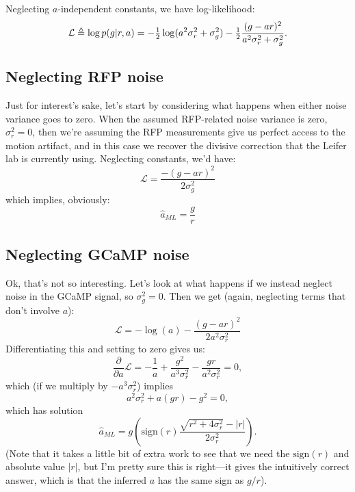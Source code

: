 \documentclass[11pt]{article}
\newcommand{\LL}{\mathcal{L}}
\newcommand{\vr}{\sigma^2_r}
\newcommand{\vg}{\sigma^2_g}
\begin{document}
Neglecting $a$-independent constants, we have log-likelihood:
\begin{equation}
\LL \triangleq \log p(g|r,a)  = - \tonehlf \log (a^2 \vr + \vg) - \tonehlf
\frac{(g-ar)^2}{a^2\vr + \vg}.  \label{eq:logli}
\end{equation}


\subsection{Neglecting RFP noise}
Just for interest's sake, let's start by considering what happens when
either noise variance goes to zero.  When the assumed RFP-related
noise variance is zero, $\vr=0$, then we're assuming the RFP
measurements give us perfect access to the motion artifact, and in
this case we recover the divisive correction that the Leifer lab is
currently using.  Neglecting constants, we'd have:
\begin{equation}
\LL = \frac{-(g-ar)^2}{2\vg}
\end{equation}
which implies, obviously:
\begin{equation}
\hat a_{ML} = \frac{g}{r}
\end{equation}

\subsection{Neglecting GCaMP noise}
Ok, that's not so interesting.  Let's look at what happens if we
instead neglect noise in the GCaMP signal, so $\vg = 0$. Then we get
(again, neglecting terms that don't involve $a$):
\begin{equation}
\LL =  -\log (a)   -  \frac{(g-ar)^2}{2a^2\vr}
\end{equation}
Differentiating this and setting to zero gives us:
\begin{equation}
\frac{\partial}{\partial a} \LL  =  -\frac{1}{a}  + \frac{g^2}{a^3
  \vr} - \frac{gr}{a^2\vr}  = 0,
\end{equation}
which (if we multiply by $-a^3 \vr$) implies
\begin{equation}
a^2 \vr + a (gr) - g^2 = 0,
\end{equation}
which has solution
\begin{equation}
\hat a_{ML} =  g \left( \mathrm{sign}(r) \frac{\sqrt{r^2 + 4\vr} - |r|}{2\vr}\right).
\end{equation}
(Note that it takes a little bit of extra work to see that we need the
$\mathrm{sign}(r)$ and absolute value $|r|$, but I'm pretty sure this
is right---it gives the intuitively correct answer, which is that the
inferred $a$ has the same sign as $g/r$). 
\end{document}
